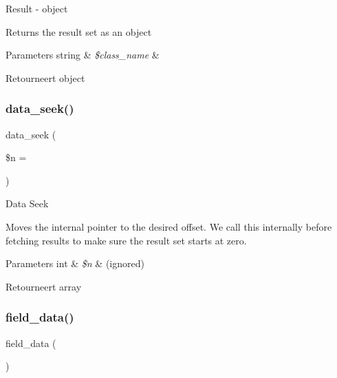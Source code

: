 Result -\/ object

Returns the result set as an object


\begin{DoxyParams}[1]{Parameters}
string & {\em \$class\+\_\+name} & \\
\hline
\end{DoxyParams}
\begin{DoxyReturn}{Retourneert}
object 
\end{DoxyReturn}
\mbox{\label{class_c_i___d_b__sqlite3__result_a8255ae91816e4206e29eb7581c5af0f1}} 
\subsubsection{\texorpdfstring{data\_seek()}{data\_seek()}}
{\footnotesize\ttfamily data\+\_\+seek (\begin{DoxyParamCaption}\item[{}]{\$n = {} }\end{DoxyParamCaption})}

Data Seek

Moves the internal pointer to the desired offset. We call this internally before fetching results to make sure the result set starts at zero.


\begin{DoxyParams}[1]{Parameters}
int & {\em \$n} & (ignored) \\
\hline
\end{DoxyParams}
\begin{DoxyReturn}{Retourneert}
array 
\end{DoxyReturn}
\mbox{\label{class_c_i___d_b__sqlite3__result_a84bffd65e53902ade1591716749a33e3}} 
\subsubsection{\texorpdfstring{field\_data()}{field\_data()}}
{\footnotesize\ttfamily field\+\_\+data (\begin{DoxyParamCaption}{ }\end{DoxyParamCaption})}

